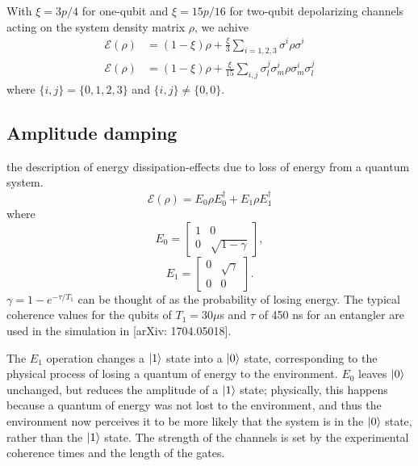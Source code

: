 \documentclass[11pt, oneside]{article}   	%
\begin{document}
With $\xi = 3p/4$ for one-qubit and $\xi = 15p/16$ for two-qubit depolarizing channels acting on the system density matrix $\rho$, we achive
\begin{align}
\mathcal{E} (\rho) &= \left(1 - \xi \right) \rho + \frac{\xi}{3} \sum_{i=1, 2, 3} \sigma^i \rho \sigma^i \\
\mathcal{E} (\rho) &= \left(1 - \xi \right) \rho + \frac{\xi}{15} \sum_{i,j} \sigma^j_l \sigma^i_m \rho \sigma^i_m \sigma^j_l
\end{align}
where $\{i, j\} = \{0, 1, 2, 3 \}$ and $\{i, j\} \ne \{0, 0 \}$.

\subsection{Amplitude damping}
the description of energy dissipation-effects due to loss of energy from a quantum system.
\begin{equation}
\mathcal{E} (\rho) = E_0 \rho E^{\dagger}_0 + E_1 \rho E^{\dagger}_1
\end{equation}
where 
\begin{equation}
E_0 = 
\begin{bmatrix}
1 & 0 \\
0 & \sqrt{1 - \gamma}
\end{bmatrix}, 
\end{equation}
\begin{equation}
E_1 = 
\begin{bmatrix}
0 & \sqrt{\gamma} \\
0 & 0
\end{bmatrix}.
\end{equation}
$\gamma = 1 - e^{- \tau / T_1}$ can be thought of as the probability of losing energy. 
The typical coherence values for the qubits of $T_1 = 30 \mu$s and $\tau$ of 450 ns for an entangler are used in the simulation in [arXiv: 1704.05018].

The $E_1$ operation changes a $\ket{1}$ state into a $\ket{0}$ state, corresponding to the physical process of losing a quantum of energy to the environment. 
$E_0$ leaves $\ket{0}$ unchanged, but reduces the amplitude of a $\ket{1}$ state; 
physically, this happens because a quantum of energy was not lost to the environment, and thus the environment now perceives it to be more likely that the system is in the $\ket{0}$  state, rather than the $\ket{1}$ state.
The strength of the channels is set by the experimental coherence times and the length of the gates.
\end{document}
